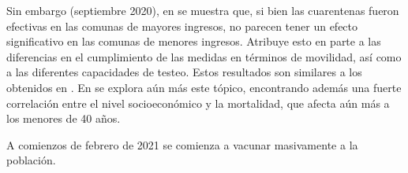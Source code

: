 Sin embargo (septiembre 2020), en \cite{Bennett2021} se muestra que, si bien las cuarentenas fueron efectivas en las comunas de mayores ingresos, no parecen tener un efecto significativo en las comunas de menores ingresos. Atribuye esto en parte a las diferencias en el cumplimiento de las medidas en términos de movilidad, así como a las diferentes capacidades de testeo. Estos resultados son similares a los obtenidos en \cite{Gozzi2021}. En \cite{Mena2021} se explora aún más este tópico, encontrando además una fuerte correlación entre el nivel socioeconómico y la mortalidad, que afecta aún más a los menores de 40 años.

A comienzos de febrero de 2021 se comienza a vacunar masivamente a la población.



